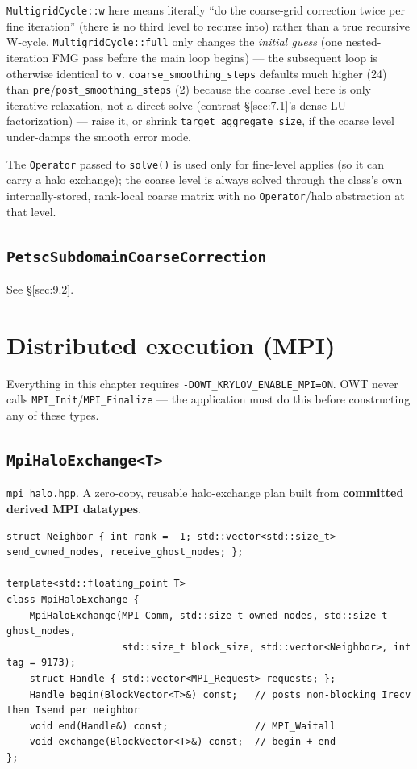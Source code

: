 \documentclass[11pt,a4paper]{report}
\newcommand{\secref}[1]{\S\ref{#1}}
\begin{document}
\lstinline!MultigridCycle::w! here means literally ``do the coarse-grid
correction twice per fine iteration'' (there is no third level to
recurse into) rather than a true recursive W-cycle.
\lstinline!MultigridCycle::full! only changes the \emph{initial guess} (one
nested-iteration FMG pass before the main loop begins) --- the
subsequent loop is otherwise identical to \lstinline!v!.
\lstinline!coarse_smoothing_steps! defaults much higher (24) than
\lstinline!pre!/\lstinline!post_smoothing_steps! (2) because the coarse level here is
only iterative relaxation, not a direct solve (contrast
\secref{sec:7.1}'s dense LU factorization) --- raise it, or shrink
\lstinline!target_aggregate_size!, if the coarse level under-damps the smooth
error mode.

The \lstinline!Operator! passed to \lstinline!solve()! is used only for fine-level
applies (so it can carry a halo exchange); the coarse level is always
solved through the class's own internally-stored, rank-local coarse
matrix with no \lstinline!Operator!/halo abstraction at that level.

\section{\texorpdfstring{\lstinline!PetscSubdomainCoarseCorrection!}{PetscSubdomainCoarseCorrection}}
\label{sec:7.4}

See \secref{sec:9.2}.

\chapter{Distributed execution (MPI)}
\label{sec:8}

Everything in this chapter requires \lstinline!-DOWT_KRYLOV_ENABLE_MPI=ON!.
OWT never calls \lstinline!MPI_Init!/\lstinline!MPI_Finalize! --- the application must
do this before constructing any of these types.

\section{\texorpdfstring{\lstinline!MpiHaloExchange<T>!}{MpiHaloExchange<T>}}
\label{sec:8.1}

\texttt{mpi\_halo.hpp}. A zero-copy, reusable halo-exchange plan built
from \textbf{committed derived MPI datatypes}.

\begin{lstlisting}
struct Neighbor { int rank = -1; std::vector<std::size_t> send_owned_nodes, receive_ghost_nodes; };

template<std::floating_point T>
class MpiHaloExchange {
    MpiHaloExchange(MPI_Comm, std::size_t owned_nodes, std::size_t ghost_nodes,
                    std::size_t block_size, std::vector<Neighbor>, int tag = 9173);
    struct Handle { std::vector<MPI_Request> requests; };
    Handle begin(BlockVector<T>&) const;   // posts non-blocking Irecv then Isend per neighbor
    void end(Handle&) const;               // MPI_Waitall
    void exchange(BlockVector<T>&) const;  // begin + end
};
\end{lstlisting}
\end{document}
